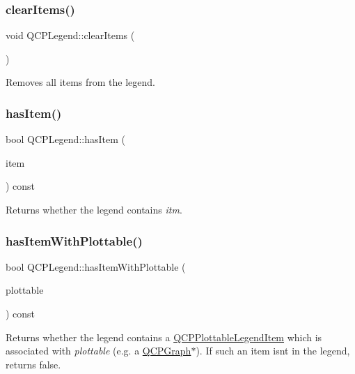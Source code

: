 \subsubsection{\texorpdfstring{clear\+Items()}{clearItems()}}
{\footnotesize\ttfamily void Q\+C\+P\+Legend\+::clear\+Items (\begin{DoxyParamCaption}{ }\end{DoxyParamCaption})}

Removes all items from the legend. \mbox{\label{class_q_c_p_legend_ad0f698e33db454a6c103b5206740e599}} 
\subsubsection{\texorpdfstring{has\+Item()}{hasItem()}}
{\footnotesize\ttfamily bool Q\+C\+P\+Legend\+::has\+Item (\begin{DoxyParamCaption}\item[{\mbox{\hyperlink{class_q_c_p_abstract_legend_item}{Q\+C\+P\+Abstract\+Legend\+Item}} $\ast$}]{item }\end{DoxyParamCaption}) const}

Returns whether the legend contains {\itshape itm}. \mbox{\label{class_q_c_p_legend_a4b90a442af871582df85c2bc13f91e88}} 
\subsubsection{\texorpdfstring{has\+Item\+With\+Plottable()}{hasItemWithPlottable()}}
{\footnotesize\ttfamily bool Q\+C\+P\+Legend\+::has\+Item\+With\+Plottable (\begin{DoxyParamCaption}\item[{const \mbox{\hyperlink{class_q_c_p_abstract_plottable}{Q\+C\+P\+Abstract\+Plottable}} $\ast$}]{plottable }\end{DoxyParamCaption}) const}

Returns whether the legend contains a \mbox{\hyperlink{class_q_c_p_plottable_legend_item}{Q\+C\+P\+Plottable\+Legend\+Item}} which is associated with {\itshape plottable} (e.\+g. a \mbox{\hyperlink{class_q_c_p_graph}{Q\+C\+P\+Graph}}$\ast$). If such an item isn\textquotesingle{}t in the legend, returns false.

